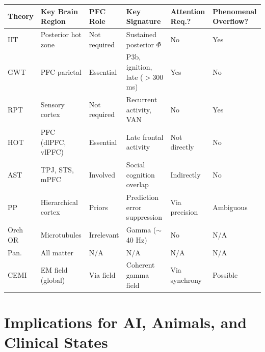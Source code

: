\documentclass[11pt,a4paper]{report}
\begin{document}
\begin{center}
\renewcommand{\arraystretch}{1.35}
\small
\begin{tabular}{>{\raggedright}p{1.4cm} >{\raggedright}p{2.3cm} >{\raggedright}p{2.0cm} >{\raggedright}p{2.3cm} >{\raggedright}p{2.0cm} >{\raggedright\arraybackslash}p{2.5cm}}
  \toprule
  \textbf{Theory} & \textbf{Key Brain Region} & \textbf{PFC Role} & \textbf{Key Signature} & \textbf{Attention Req.?} & \textbf{Phenomenal Overflow?} \\
  \midrule
  IIT & Posterior hot zone & Not required & Sustained posterior $\Phi$ & No & Yes \\
  GWT & PFC-parietal & Essential & P3b, ignition, late ($>$300 ms) & Yes & No \\
  RPT & Sensory cortex & Not required & Recurrent activity, VAN & No & Yes \\
  HOT & PFC (dlPFC, vlPFC) & Essential & Late frontal activity & Not directly & No \\
  AST & TPJ, STS, mPFC & Involved & Social cognition overlap & Indirectly & No \\
  PP & Hierarchical cortex & Priors & Prediction error suppression & Via precision & Ambiguous \\
  Orch OR & Microtubules & Irrelevant & Gamma ($\sim$40 Hz) & No & N/A \\
  Pan. & All matter & N/A & N/A & N/A & N/A \\
  CEMI & EM field (global) & Via field & Coherent gamma field & Via synchrony & Possible \\
  \bottomrule
\end{tabular}
\end{center}

\section{Implications for AI, Animals, and Clinical States}
\end{document}

